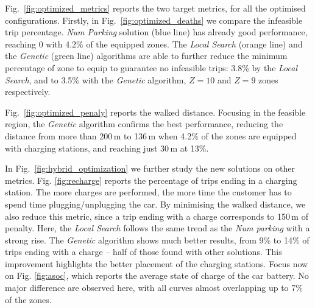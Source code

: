 \documentclass[review, letterpaper,3p, 11pt]{elsarticle}
\begin{document}
Fig.~\ref{fig:optimized_metrics} reports the two target metrics, for all the optimised configurations.
Firstly, in Fig.~\ref{fig:optimized_deaths} we compare the infeasible trip percentage. \textit{Num Parking} solution (blue line) has already good performance, reaching 0 with 4.2\% of the equipped zones. 
The \textit{Local Search} (orange line) and the \textit{Genetic} (green line) algorithms are able to further reduce the minimum percentage of zone to equip to guarantee no infeasible trips: 3.8\% by the \textit{Local Search}, and to 3.5\% with the \textit{Genetic} algorithm, $Z=10$ and $Z=9$ zones respectively.

Fig.~\ref{fig:optimized_penaly} reports the walked distance. Focusing in the feasible region, the \textit{Genetic} algorithm confirms the best performance, reducing the distance from more than 200\,m to 136\,m when 4.2\% of the zones are equipped with charging stations, and reaching just 30\,m at 13\%. 




In Fig.~\ref{fig:hybrid_optimization} we further study the new solutions on other metrics.
Fig. \ref{fig:recharge} reports the percentage of trips ending in a charging station. The more charges are performed, the more time the customer has to spend time plugging/unplugging the car. By minimising the walked distance, we also reduce this metric, since a trip ending with a charge corresponds to 150\,m of penalty.
Here, the \textit{Local Search} follows the same trend as the \textit{Num parking} with a strong rise. The \textit{Genetic} algorithm shows much better results, from 9\% to 14\% of trips ending with a charge -- half of those found with other solutions. 
This improvement highlights the better placement of the charging stations.
Focus now on Fig. \ref{fig:asoc}, which reports the average state of charge of the car battery. 
No major difference are observed here, with all curves almost overlapping up to 7\% of the zones.
\end{document}
